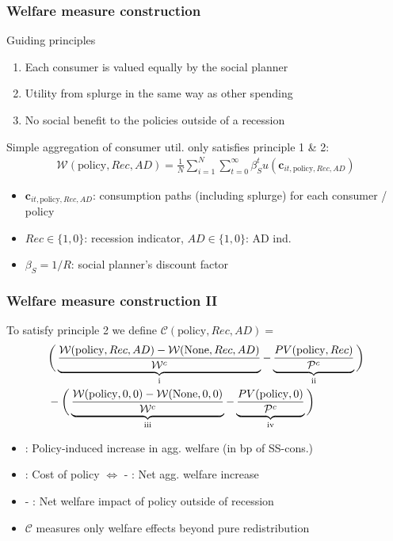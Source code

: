 \documentclass[pdflatex]{beamer}
\newcommand{\RNum}[1]{\uppercase\expandafter{\romannumeral #1\relax}}
\begin{document}
\begin{frame}
\frametitle{Welfare measure construction}

	Guiding principles
	
	\begin{enumerate}
		\item Each consumer is valued equally by the social planner 
		\item Utility from splurge in the same way as other spending
		\item No social benefit to the policies outside of a recession
	\end{enumerate} 
	
	\vspace{0.6cm}
	
	Simple aggregation of consumer util. only satisfies principle 1 \& 2:
	\begin{align*}
	\mathcal{W}(\text{policy},Rec,AD) =\frac{1}{N}\sum_{i=1}^{N} \sum_{t=0}^{\infty} \beta_S^t u(\mathbf{c}_{it,\text{policy},Rec,AD}) 
	\end{align*}
	
	\begin{itemize}
		\item $\mathbf{c}_{it,\text{policy},Rec,AD}$: consumption paths (including splurge) for each consumer / policy
		\item $Rec\in\{1,0\}$: recession indicator, $AD\in\{1,0\}$: AD ind.
		\item $\beta_S = 1/R$: social planner's discount factor 
	\end{itemize}	

\end{frame}


\begin{frame}
\frametitle{Welfare measure construction II}

	To satisfy principle 2 we define $\mathcal{C}(\text{policy},Rec,AD) =$
	\begin{align*}
	& \bigg( \underbrace{\frac{\mathcal{W}(\text{policy},Rec,AD)-\mathcal{W}(\text{None},Rec,AD)}{\mathcal{W}^c}}_\text{\RNum{1}}  - \underbrace{\frac{PV(\text{policy},Rec)}{\mathcal{P}^c} }_\text{\RNum{2}} \bigg) \nonumber \\  
	& -
	\bigg( \underbrace{\frac{\mathcal{W}(\text{policy},0,0) - \mathcal{W}(\text{None},0,0)}{\mathcal{W}^c}}_\text{\RNum{3}}  - \underbrace{\frac{PV(\text{policy},0)}{\mathcal{P}^c}}_\text{\RNum{4}}  \bigg) 
	\end{align*}
	
	\begin{itemize}
		\item \RNum{1}: Policy-induced increase in agg. welfare (in bp of SS-cons.)
		\item \RNum{2}: Cost of policy $\Leftrightarrow$ \RNum{1} - \RNum{2}: Net agg. welfare increase
		\item \RNum{3} - \RNum{4}: Net welfare impact of policy outside of recession
		\item $\mathcal{C}$ measures only welfare effects beyond pure redistribution
	\end{itemize}

\end{frame}
\end{document}
